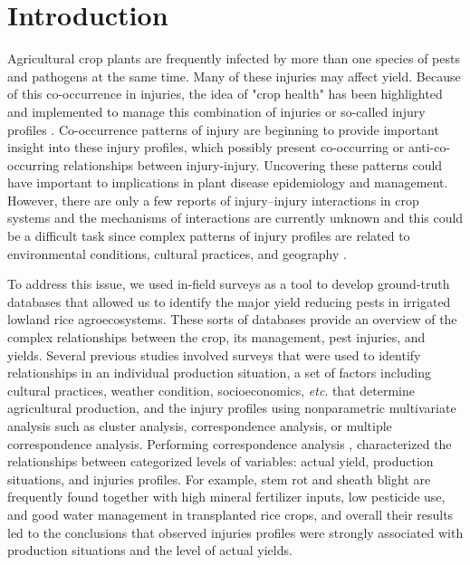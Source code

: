 \section{Introduction}
Agricultural crop plants are frequently infected by more than one species of pests and pathogens at the same time. Many of these injuries may affect yield. Because of this co-occurrence in injuries, the idea of "crop health" has been highlighted and implemented to manage this combination of injuries or so-called injury profiles \cite{Savary_2006} . Co-occurrence patterns of injury are beginning to provide important insight into these injury profiles, which possibly present co-occurring or anti-co-occurring relationships between injury-injury. Uncovering these patterns could have important to implications in plant disease epidemiology and management. However, there are only a few reports of injury–injury interactions in crop systems and the mechanisms of interactions are currently unknown and this could be a difficult task since complex patterns of injury profiles are related to environmental conditions, cultural practices, and geography \cite{Willocquet_2008_Simulating}.

To address this issue, we used in-field surveys as a tool to develop ground-truth databases that allowed us to identify the major yield reducing pests in irrigated lowland rice agroecosystems. These sorts of databases provide an overview of the complex relationships between the crop, its management, pest injuries, and yields. Several previous studies \cite{Savary_2000_Characterization,Savary_2000_Quantification,Dong_2010_Characterization,Reddy_2011_Characterizing} involved surveys that were used to identify relationships in an individual production situation, a set of factors including cultural practices, weather condition, socioeconomics, \textit{etc}. that determine agricultural production, and the injury profiles using nonparametric multivariate analysis such as cluster analysis, correspondence analysis, or multiple correspondence analysis. Performing correspondence analysis \cite{Savary_1995}, characterized the relationships between categorized levels of variables: actual yield, production situations, and injuries profiles. For example, stem rot and sheath blight are frequently found together with high mineral fertilizer inputs, low pesticide use, and good water management in transplanted rice crops, and overall their results led to the conclusions that observed injuries profiles were strongly associated with production situations and the level of actual yields. 

